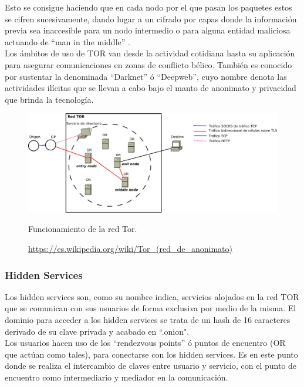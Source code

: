 Esto se consigue haciendo que en cada nodo por el que pasan los paquetes estos se cifren sucesivamente, dando lugar a un cifrado por capas donde la información previa sea inaccesible para un nodo intermedio o para alguna entidad maliciosa actuando de \hyphenquote{spanish}{man in the middle}
\cite{WikiManInTheMiddle}. \\

Los ámbitos de uso de TOR van desde la actividad cotidiana hasta su aplicación para asegurar comunicaciones en zonas de conflicto bélico. También es conocido por sustentar la denominada \hyphenquote{spanish}{Darknet} ó \hyphenquote{spanish}{Deepweb}, cuyo nombre denota las actividades ilícitas que se llevan a cabo bajo el manto de anonimato y privacidad que brinda la tecnología. \\

\begin{figure}[H]
	\centering
	\includegraphics[width=\textwidth]{imagenes/funcionamiento_tor}
	\caption{Funcionamiento de la red Tor.}
	\caption*{\small \url {https://es.wikipedia.org/wiki/Tor_(red_de_anonimato)}}
	\label{fig:redtor}
\end{figure}

\subsubsection {Hidden Services}

Los hidden services \cite{TorHiddenServices} son, como su nombre indica, servicios alojados en la red TOR que se comunican con sus usuarios de forma exclusiva por medio de la misma. El dominio para acceder a los hidden services se trata de un hash de 16 caracteres derivado de su clave privada y acabado en ``.onion". \\

Los usuarios hacen uso de los \hyphenquote{spanish}{rendezvous points} ó puntos de encuentro (OR que actúan como tales), para conectarse con los hidden services. Es en este punto donde se realiza el intercambio de claves entre usuario y servicio, con el punto de encuentro como intermediario y mediador en la comunicación. \\ 


